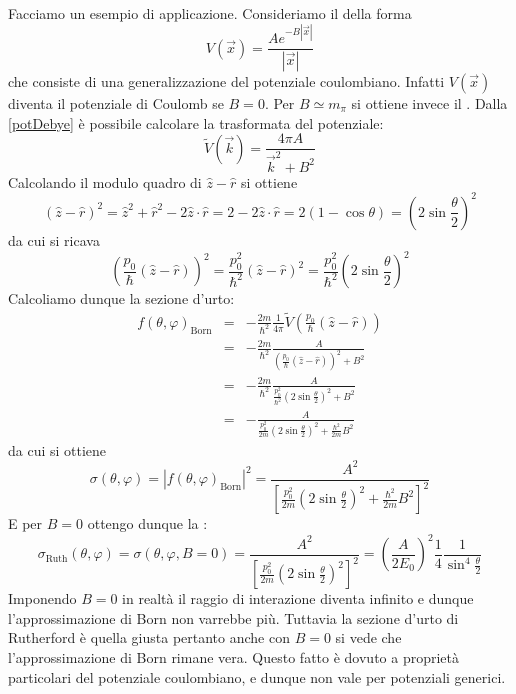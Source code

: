 \documentclass[../../FisicaTeorica.tex]{subfiles}
\begin{document}
Facciamo un esempio di applicazione. Consideriamo il {} della forma
\begin{equation}
\label{potDebye}
V (\vec{x}) = \frac{A e^{- B | \vec{x} |}}{| \vec{x} |}
\end{equation}
che consiste di una generalizzazione del potenziale coulombiano. Infatti $V
(\vec{x})$ diventa il potenziale di Coulomb se $B = 0$. Per $B \simeq m_{\pi}$
si ottiene invece il {}. Dalla \eqref{potDebye}  {\`e} possibile calcolare la trasformata del potenziale:
\[ \tilde{V} (\vec{k}) = \frac{4 \pi A}{\vec{k}^2 + B^2} \]
Calcolando il modulo quadro di $\hat{z} - \hat{r}$ si ottiene
\[ (\hat{z} - \hat{r})^2 = \hat{z}^2 + \hat{r}^2 - 2 \hat{z} \cdot \hat{r} = 2
   - 2 \hat{z} \cdot \hat{r} = 2 (1 - \cos \theta) = \left( 2 \sin
   \frac{\theta}{2} \right)^2 \]
da cui si ricava
\[ \left( \frac{p_0}{\hbar} (\hat{z} - \hat{r}) \right)^2 =
   \frac{p_0^2}{\hbar^2} (\hat{z} - \hat{r})^2 = \frac{p_0^2}{\hbar^2}  \left(
   2 \sin \frac{\theta}{2} \right)^2 \]
Calcoliamo dunque la sezione d'urto:
\begin{eqnarray*}
  f (\theta, \varphi)_{\text{Born}} & = & - \frac{2 m}{\hbar^2}  \frac{1}{4
  \pi}  \tilde{V} \left( \frac{p_0}{\hbar} (\hat{z} - \hat{r}) \right)\\
  & = & - \frac{2 m}{\hbar^2}  \frac{A}{\left( \frac{p_0}{\hbar} (\hat{z} -
  \hat{r}) \right)^2 + B^2}\\
  & = & - \frac{2 m}{\hbar^2}  \frac{A}{\frac{p_0^2}{\hbar^2}  \left( 2 \sin
  \frac{\theta}{2} \right)^2 + B^2}\\
  & = & - \frac{A}{ \frac{p_0^2}{2 m} \left( 2 \sin \frac{\theta}{2}
  \right)^2 + \frac{\hbar^2}{2 m} B^2}
\end{eqnarray*}
da cui si ottiene
\[ \sigma (\theta, \varphi) = \left| f (\theta, \varphi)_{\text{Born}}
   \right|^2 = \frac{A^2}{\left[ \frac{p_0^2}{2 m}  \left( 2 \sin
   \frac{\theta}{2} \right)^2 + \frac{\hbar^2}{2 m} B^2 \right]^2} \]
E per $B = 0$ ottengo dunque la :
\[ \sigma_{\text{Ruth}} (\theta, \varphi) = \sigma (\theta, \varphi, B = 0) =
   \frac{A^2}{\left[ \frac{p_0^2}{2 m}  \left( 2 \sin \frac{\theta}{2}
   \right)^2 \right]^2} = \left( \frac{A}{2 E_0 } \right)^2 \frac{1}{4} 
   \frac{1}{\sin^4  \frac{\theta}{2}} \]
Imponendo $B = 0$ in realt{\`a} il raggio di interazione diventa infinito e
dunque l'approssimazione di Born non varrebbe pi{\`u}. Tuttavia la sezione
d'urto di Rutherford {\`e} quella giusta pertanto anche con $B = 0$ si vede
che l'approssimazione di Born rimane vera. Questo fatto {\`e} dovuto a
propriet{\`a} particolari del potenziale coulombiano, e dunque non vale per
potenziali generici.
\end{document}
